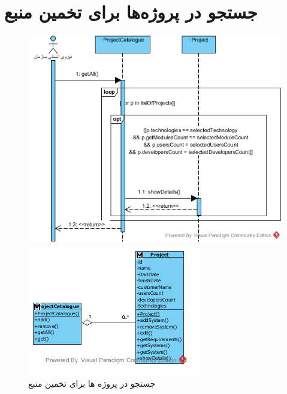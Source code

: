 \section{جستجو در پروژه‌ها برای تخمین منبع}
\begin{figure}[H]
	\centering
	\includegraphics[scale=0.9]{img/sequence-analysis/SearchInProjects}
	
	
	\includegraphics[scale=0.9]{img/sequence-analysis/SearchInProjectsC}
	\caption{جستجو در پروژه ها برای تخمین منبع}
\end{figure}

